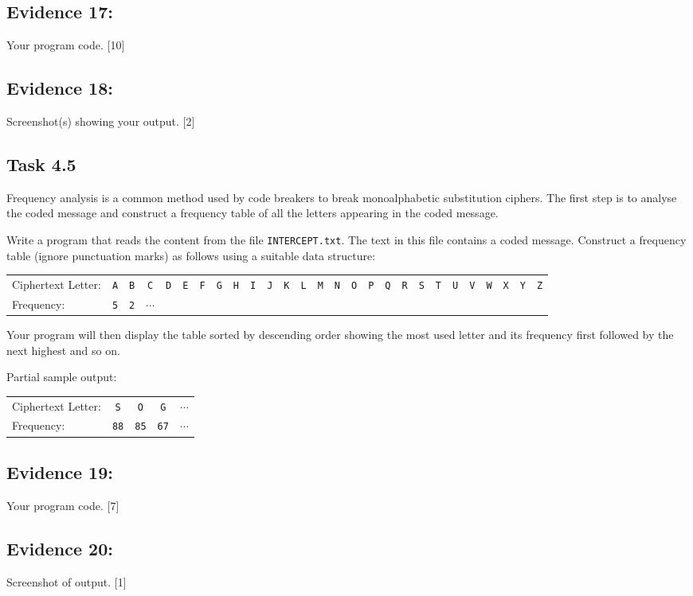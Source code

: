 \subsection*{Evidence 17: }

Your program code. \hfill{}{[}10{]}

\subsection*{Evidence 18: }

Screenshot(s) showing your output. \hfill{}{[}2{]}

\subsection*{Task 4.5 }

Frequency analysis is a common method used by code breakers to break
monoalphabetic substitution ciphers. The first step is to analyse
the coded message and construct a frequency table of all the letters
appearing in the coded message. 

Write a program that reads the content from the file \texttt{INTERCEPT.txt}.
The text in this file contains a coded message. Construct a frequency
table (ignore punctuation marks) as follows using a suitable data
structure: 

\begin{tabular}{lcccccccccccccccccccccccccc}
Ciphertext Letter: & \texttt{A} & \texttt{B} & \texttt{C} & \texttt{D} & \texttt{E} & \texttt{F} & \texttt{G} & \texttt{H} & \texttt{I} & \texttt{J} & \texttt{K} & \texttt{L} & \texttt{M} & \texttt{N} & \texttt{O} & \texttt{P} & \texttt{Q} & \texttt{R} & \texttt{S} & \texttt{T} & \texttt{U} & \texttt{V} & \texttt{W} & \texttt{X} & \texttt{Y} & \texttt{Z}\tabularnewline
Frequency: & \texttt{5} & \texttt{2} & $\cdots$ &  &  &  &  &  &  &  &  &  &  &  &  &  &  &  &  &  &  &  &  &  &  & \tabularnewline
\end{tabular}

Your program will then display the table sorted by descending order
showing the most used letter and its frequency first followed by the
next highest and so on.

Partial sample output: 

\begin{tabular}{lcccc}
Ciphertext Letter: & \texttt{S} & \texttt{O} & \texttt{G} & \texttt{$\cdots$}\tabularnewline
Frequency: & \texttt{88} & \texttt{85} & \texttt{67} & $\cdots$\tabularnewline
\end{tabular}

\subsection*{Evidence 19: }

Your program code. \hfill{} {[}7{]}

\subsection*{Evidence 20: }

Screenshot of output. \hfill{}{[}1{]}